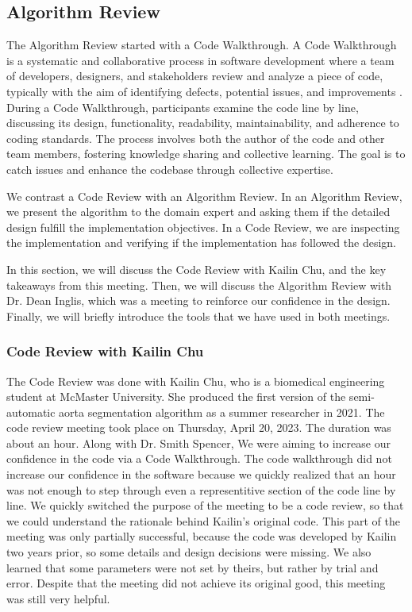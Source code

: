 \subsection{Algorithm Review}

The Algorithm Review started with a Code Walkthrough. A Code Walkthrough is a systematic and collaborative process in software development where a team of developers, designers, and stakeholders review and analyze a piece of code, typically with the aim of identifying defects, potential issues, and improvements \cite{Corporate_2023}. During a Code Walkthrough, participants examine the code line by line, discussing its design, functionality, readability, maintainability, and adherence to coding standards. The process involves both the author of the code and other team members, fostering knowledge sharing and collective learning. The goal is to catch issues and enhance the codebase through collective expertise.

We contrast a Code Review with an Algorithm Review. In an Algorithm Review, we present the algorithm to the domain expert and asking them if the detailed design fulfill the implementation objectives. In a Code Review, we are inspecting the implementation and verifying if the implementation has followed the design. 

In this section, we will discuss the Code Review with Kailin Chu, and the key takeaways from this meeting. Then, we will discuss the Algorithm Review with Dr. Dean Inglis, which was a meeting to reinforce our confidence in the design. Finally, we will briefly introduce the tools that we have used in both meetings.

\subsubsection{Code Review with Kailin Chu}
The Code Review was done with Kailin Chu, who is a biomedical engineering student at McMaster University. She produced the first version of the semi-automatic aorta segmentation algorithm as a summer researcher in 2021. The code review meeting took place on Thursday, April 20, 2023. The duration was about an hour. Along with Dr. Smith Spencer, We were aiming to increase our confidence in the code via a Code Walkthrough. The code walkthrough did not increase our confidence in the software because we quickly realized that an hour was not enough to step through even a representitive section of the code line by line. We quickly switched the purpose of the meeting to be a code review, so that we could understand the rationale behind Kailin's original code. This part of the meeting was only partially successful, because the code was developed by Kailin two years prior, so some details and design decisions were missing. We also learned that some parameters were not set by theirs, but rather by trial and error. Despite that the meeting did not achieve its original good, this meeting was still very helpful. 

